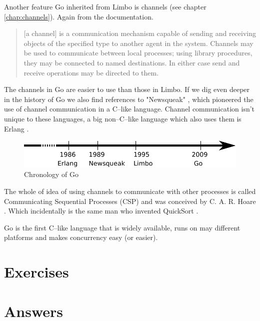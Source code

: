 Another feature Go inherited from Limbo is channels (see chapter
\ref{chap:channels}). Again from the documentation.
\begin{quote}
[a channel] is a communication mechanism capable of sending and receiving objects of
the specified type to another agent in the system. Channels may be used
to communicate between local processes; using library procedures, they
may be connected to named destinations. In either case send and receive
operations may be directed to them.
\end{quote}
The channels in Go are easier to use than those in Limbo.
If we dig even deeper in the history of Go we also find references
to "Newsqueak" \cite{newsqueak}, which pioneered the use of 
channel communication in a C--like language. Channel
communication isn't unique to these languages, a big non--C--like
language which also uses them is Erlang \cite{erlang}.

\begin{figure}[H]
\caption{Chronology of Go}
\label{fig:chrono-of-go}
\begin{center}
\includegraphics[scale=0.65]{fig/go-history.pdf}
\end{center}
\end{figure}

The whole of idea of using channels to communicate with other processes
is called Communicating Sequential Processes (CSP) and was conceived
by C. A. R. Hoare \cite{hoare}. Which incidentally is the same man who
invented QuickSort \cite{Quicksort}.

\begin{lbar}
\noindent{}Go is the first C--like language that is widely available, runs on may
different platforms and makes concurrency easy (or easier).
\end{lbar}

\section{Exercises}


\cleardoublepage
\section{Answers}
\shipoutAnswer
